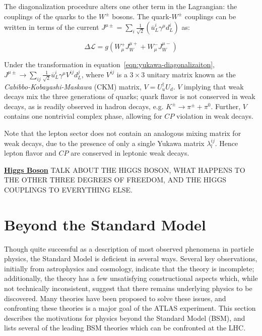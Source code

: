 The diagonalization procedure alters one other term in the Lagrangian: the couplings of the quarks to the $W^{\pm}$ bosons. The quark-$W^{\pm}$ couplings can be written in terms of the current $J^{\mu\pm}=\sum_{i} \frac1{\sqrt{2}}\left(\overline{u}_L^i\gamma^{\mu}d_L^i\right)$ as:

\begin{equation}
	\Delta\mathcal{L} = g (W^+_{\mu}J^{\mu+}_W + W^{-}_{\mu}J^{\mu -}_{W})
\end{equation}

Under the transformation in equation~\ref{eqn:yukawa-diagonalizaiton}, $J^{\mu\pm}\rightarrow \sum_{ij}\frac{1}{\sqrt{2}} \overline{u}_L^i \gamma^{\mu} V^{ij} d_L^j$, where $V^{ij}$ is a $3\times 3$ unitary matrix known as the \emph{Cabibbo-Kobayashi-Maskawa} (CKM) matrix, $V = U_{u}^{\dagger} U_d$. $V$ implying that weak decays mix the three generations of quarks; quark flavor is not conserved in weak decays, as is readily observed in hadron decays, e.g. $K^{\pm}\rightarrow \pi^{\pm}+\pi^0$. Further, $V$ contains one nontrivial complex phase, allowing for $CP$ violation in weak decays. 

Note that the lepton sector does not contain an analogous mixing matrix for weak decays, due to the presence of only a single Yukawa matrix $\lambda^{ij}_l$. Hence lepton flavor and $CP$ are conserved in leptonic weak decays.

\underline{\textbf{Higgs Boson}}
TALK ABOUT THE HIGGS BOSON, WHAT HAPPENS TO THE OTHER THREE DEGREES OF FREEDOM, AND THE HIGGS COUPLINGS TO EVERYTHING ELSE.




\section{Beyond the Standard Model}\label{sec:bsm}
Though quite successful as a description of most observed phenomena in particle physics, the Standard Model is deficient in several ways. Several key observations, initially from astrophysics and cosmology, indicate that the theory is incomplete; additionally, the theory has a few unsatisfying constructional aspects which, while not technically inconsistent, suggest that there remains underlying physics to be discovered. Many theories have been proposed to solve these issues, and confronting these theories is a major goal of the ATLAS experiment. This section describes the motivations for physics beyond the Standard Model (BSM), and lists several of the leading BSM theories which can be confronted at the LHC.

